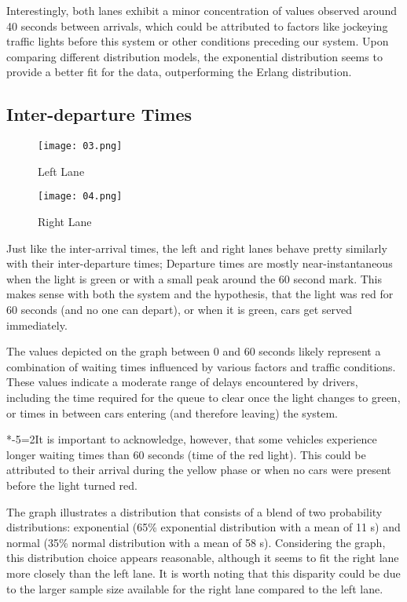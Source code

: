 \documentclass[12pt, a4paper]{article}
\begin{document}
	Interestingly, both lanes exhibit a minor concentration of values observed around 40 seconds between arrivals, which could be attributed to factors like jockeying traffic lights before this system or other conditions preceding our system. Upon comparing different distribution models, the exponential distribution seems to provide a better fit for the data, outperforming the Erlang distribution.
	
	\subsection{Inter-departure Times}
	\begin{figure}[h]
		\centering
		\begin{minipage}[b]{0.48\textwidth}
			\texttt{[image: 03.png]}
			\caption{Left Lane}
		\end{minipage}
		\hfill
		\begin{minipage}[b]{0.48\textwidth}
			\texttt{[image: 04.png]}
			\caption{Right Lane}
		\end{minipage}
	\end{figure}
	
	Just like the inter-arrival times, the left and right lanes behave pretty similarly with their inter-departure times; Departure times are mostly near-instantaneous when the light is green or with a small peak around the 60 second mark. This makes sense with both the system and the hypothesis, that the light was red for 60 seconds (and no one can depart), or when it is green, cars get served immediately. 
	
	The values depicted on the graph between 0 and 60 seconds likely represent a combination of waiting times influenced by various factors and traffic conditions. These values indicate a moderate range of delays encountered by drivers, including the time required for the queue to clear once the light changes to green, or times in between cars entering (and therefore leaving) the system.
	
*-5=2It is important to acknowledge, however, that some vehicles experience longer waiting times than 60 seconds (time of the red light). This could be attributed to their arrival during the yellow phase or when no cars were present before the light turned red.
	
	The graph illustrates a distribution that consists of a blend of two probability distributions: exponential (65\% exponential distribution with a mean of 11 s) and normal (35\% normal distribution with a mean of 58 s). Considering the graph, this distribution choice appears reasonable, although it seems to fit the right lane more closely than the left lane. It is worth noting that this disparity could be due to the larger sample size available for the right lane compared to the left lane.
	
\end{document}
